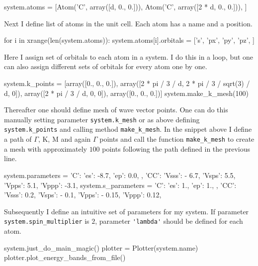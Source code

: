 \begin{python}
system.atoms = [Atom('C', array([d, 0., 0.])),
                Atom('C', array([2 * d, 0., 0.])), ]
\end{python}

Next I define list of atoms in the unit cell. Each atom has a name and a position.

\begin{python}
for i in xrange(len(system.atoms)):
    system.atoms[i].orbitals = ['s', 'px', 'py', 'pz', ]
\end{python}

Here I assign set of orbitals to each atom in a system. I do this in a loop, but one can also assign different sets of orbitals for every atom one by one.

\begin{python}
system.k_points = [array([0., 0., 0.]),
                   array([2 * pi / 3 / d, 2 * pi / 3 / sqrt(3) / d, 0]),
                   array([2 * pi / 3 / d, 0, 0]),
                   array([0., 0., 0.])]
system.make_k_mesh(100)
\end{python}

Thereafter one should define mesh of wave vector points. One can do this manually setting parameter \verb!system.k_mesh! or as above defining \verb!system.k_points! and calling method \verb!make_k_mesh!. In the snippet above I define a path of $\Gamma$, K, M and again $\Gamma$ points and call the function \verb!make_k_mesh! to create a mesh with approximately $100$ points following the path defined in the previous line.

\begin{python}
system.parameters = {
    'C': {
        'es': -8.7,
        'ep': 0.0,
    },
    'CC': {
        'Vsss': - 6.7,
        'Vsps': 5.5,
        'Vpps': 5.1,
        'Vppp': -3.1,
    }
}
system.s_parameters = {
    'C': {
        'es': 1.,
        'ep': 1.,
    },
    'CC': {
        'Vsss': 0.2,
        'Vsps': - 0.1,
        'Vpps': - 0.15,
        'Vppp': 0.12,
    }
}
\end{python}

Subsequently I define an intuitive set of parameters for my system. If parameter \verb!system.spin_multiplier! is $2$, parameter \verb!'lambda'! should be defined for each atom.

\begin{python}
system.just_do_main_magic()
plotter = Plotter(system.name)
plotter.plot_energy_bands_from_file()
\end{python}

